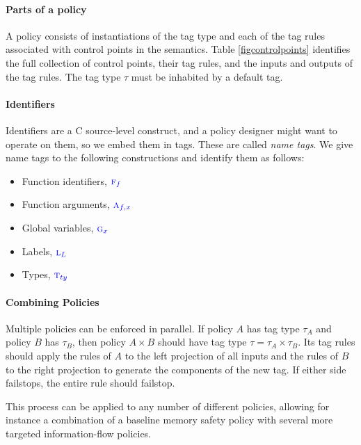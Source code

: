 \documentclass{llncs}
\begin{document}
\paragraph*{Parts of a policy}

A policy consists of instantiations of the tag type
and each of the tag rules associated with control points in the semantics. Table \cref{figcontrolpoints}
identifies the full collection of control points, their tag rules, and the inputs and outputs of the tag rules.
The tag type \(\tau\) must be inhabited by a default tag.

\paragraph*{Identifiers}

Identifiers are a C source-level construct, and a policy designer might want to operate on them,
so we embed them in tags. These are called {\em name tags}. We give name tags to the
following constructions and identify them as follows:
\begin{itemize}
\item Function identifiers, \({\color{blue} \textnormal{\sc f}_{f}}\)
\item Function arguments, \({\color{blue} \textnormal{\sc a}_{f,x}}\)
\item Global variables, \({\color{blue} \textnormal{\sc g}_{x}}\)
\item Labels, \({\color{blue} \textnormal{\sc l}_{L}}\)
\item Types, \({\color{blue} \textnormal{\sc t}_{ty}}\)
\end{itemize}

\paragraph*{Combining Policies}

Multiple policies can be enforced in parallel. If policy \(A\) has tag type \(\tau_A\)
and policy \(B\) has \(\tau_B\), then policy \(A \times B\) should have tag type
\(\tau = \tau_A \times \tau_B\). Its tag rules should apply the rules of \(A\) to
the left projection of all inputs and the rules of \(B\) to the right projection
to generate the components of the new tag. If either side failstops, the entire
rule should failstop.


This process can be applied to any number of different policies, allowing for instance
a combination of a baseline memory safety policy with several more targeted
information-flow policies.
\end{document}
